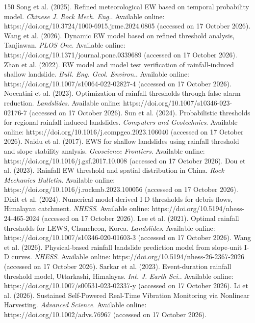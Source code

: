 \begin{thebibliography}{150}
Song et al. (2025). Refined meteorological EW based on temporal probability model. \textit{Chinese J. Rock Mech. Eng.}. Available online: https://doi.org/10.3724/1000-6915.jrme.2024.0805 (accessed on 17 October 2026).
Wang et al. (2026). Dynamic EW model based on refined threshold analysis, Tanjiawan. \textit{PLOS One}. Available online: https://doi.org/10.1371/journal.pone.0339689 (accessed on 17 October 2026).
Zhan et al. (2022). EW model and model test verification of rainfall-induced shallow landslide. \textit{Bull. Eng. Geol. Environ.}. Available online: https://doi.org/10.1007/s10064-022-02827-4 (accessed on 17 October 2026).
Nocentini et al. (2023). Optimization of rainfall thresholds through false alarm reduction. \textit{Landslides}. Available online: https://doi.org/10.1007/s10346-023-02176-7 (accessed on 17 October 2026).
Sun et al. (2024). Probabilistic thresholds for regional rainfall induced landslides. \textit{Computers and Geotechnics}. Available online: https://doi.org/10.1016/j.compgeo.2023.106040 (accessed on 17 October 2026).
Naidu et al. (2017). EWS for shallow landslides using rainfall threshold and slope stability analysis. \textit{Geoscience Frontiers}. Available online: https://doi.org/10.1016/j.gsf.2017.10.008 (accessed on 17 October 2026).
Dou et al. (2023). Rainfall EW threshold and spatial distribution in China. \textit{Rock Mechanics Bulletin}. Available online: https://doi.org/10.1016/j.rockmb.2023.100056 (accessed on 17 October 2026).
Dixit et al. (2024). Numerical-model-derived I-D thresholds for debris flows, Himalayan catchment. \textit{NHESS}. Available online: https://doi.org/10.5194/nhess-24-465-2024 (accessed on 17 October 2026).
Lee et al. (2021). Optimal rainfall thresholds for LEWS, Chuncheon, Korea. \textit{Landslides}. Available online: https://doi.org/10.1007/s10346-020-01603-3 (accessed on 17 October 2026).
Wang et al. (2026). Physical-based rainfall landslide prediction model from slope-unit I-D curves. \textit{NHESS}. Available online: https://doi.org/10.5194/nhess-26-2367-2026 (accessed on 17 October 2026).
Sarkar et al. (2023). Event-duration rainfall threshold model, Uttarkashi, Himalayas. \textit{Int. J. Earth Sci.}. Available online: https://doi.org/10.1007/s00531-023-02337-y (accessed on 17 October 2026).
Li et al. (2026). Sustained Self-Powered Real-Time Vibration Monitoring via Nonlinear Harvesting. \textit{Advanced Science}. Available online: https://doi.org/10.1002/advs.76967 (accessed on 17 October 2026).

\end{thebibliography}
